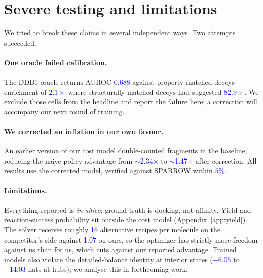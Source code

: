 \documentclass{article}
\newcommand{\checkval}[1]{\textcolor{blue}{#1}}
\begin{document}


\section{Severe testing and limitations}
\label{sec:severe}

We tried to break these claims in several independent ways. Two attempts succeeded.

\paragraph{One oracle failed calibration.}
The DDB1 oracle returns AUROC \checkval{0.688} against property-matched decoys---enrichment of \checkval{$2.1\times$} where structurally matched decoys had
suggested \checkval{$82.9\times$}. We exclude those cells from the headline and report the failure here; a correction will accompany our next round of training.

\paragraph{We corrected an inflation in our own favour.}
An earlier version of our cost model double-counted fragments in the baseline, reducing the naive-policy advantage from \checkval{$\sim$2.34$\times$} to
\checkval{$\sim$1.47$\times$} after correction. All results use the corrected model, verified against SPARROW within \checkval{$5\%$}.

\paragraph{Limitations.}
Everything reported is \emph{in silico}; ground truth is docking, not affinity. Yield and reaction-success probability sit outside the cost model
(Appendix~\ref{app:yield}). The solver receives roughly \checkval{16} alternative recipes per molecule on the competitor's side against \checkval{1.07} on ours, so the optimizer has strictly more freedom against us than for us, which cuts against our reported advantage. Trained models also violate the detailed-balance identity at interior states (\checkval{$-6.05$} to \checkval{$-14.03$} nats at hubs); we analyse this in forthcoming work.
\end{document}
